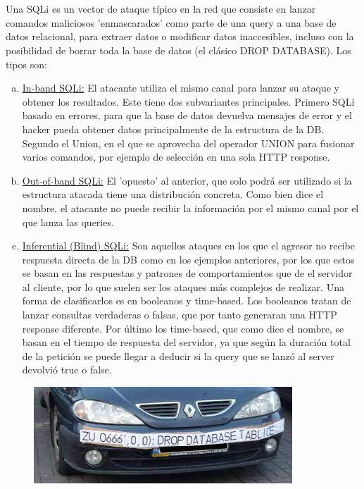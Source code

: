 \documentclass[12pt,a4paper,oneside,onecolumn]{article}
\begin{document}
 
    \section{}
    Una SQLi es un vector de ataque t\'ipico en la red que consiste en lanzar comandos maliciosos 'enmascarados' como parte de una query a una base de datos relacional, para extraer datos o modificar datos inaccesibles, incluso con la posibilidad de borrar toda la base de datos (el cl\'asico DROP DATABASE).
    \newline
    Los tipos son:
    \begin{enumerate}[a)]
        \item
        \underline{In-band SQLi:} El atacante utiliza el mismo canal para lanzar su ataque y obtener los resultados. Este tiene dos subvariantes principales. Primero SQLi basado en errores, para que la base de datos devuelva mensajes de error y el hacker pueda obtener datos principalmente de la estructura de la DB. Segundo el Union, en el que se aprovecha del operador UNION para fusionar varios comandos, por ejemplo de selecci\'on en una sola HTTP response.
        \item
        \underline{Out-of-band SQLi:} El 'opuesto' al anterior, que solo podrá ser utilizado si la estructura atacada tiene una distribuci\'on concreta. Como bien dice el nombre, el atacante no puede recibir la informaci\'on por el mismo canal por el que lanza las queries.
        \item
        \underline{Inferential (Blind) SQLi:} Son aquellos ataques en los que el agresor no recibe respuesta directa de la DB como en los ejemplos anteriores, por los que estos se basan en las respuestas y patrones de comportamientos que de el servidor al cliente, por lo que suelen ser los ataques m\'as complejos de realizar. Una forma de clasificarlos es en booleanos y time-based. Los booleanos tratan de lanzar consultas verdaderas o falsas, que por tanto generaran una HTTP response diferente. Por \'ultimo los time-based, que como dice el nombre, se basan en el tiempo de respuesta del servidor, ya que seg\'un la duraci\'on total de la petici\'on se puede llegar a deducir si la query que se lanz\'o al server devolvi\'o true o false.
    \end{enumerate}
    
    \begin{figure}[!h]
		\centering
		\includegraphics[scale=1.2]{SQLi.jpg}
		\caption{}
		\label{fig:1}
	\end{figure}
	\newpage
\end{document}
